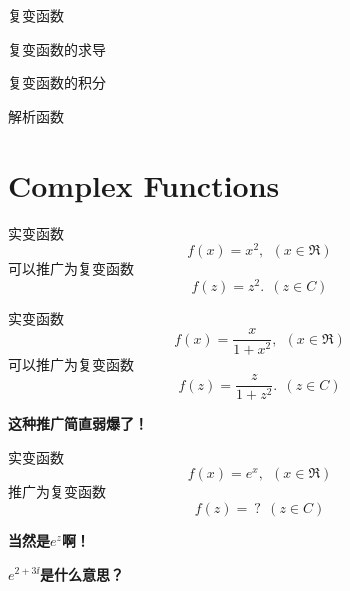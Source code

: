 \documentclass[CJK]{beamer}
\date{}
\begin{document}


\begin{frame}
\bch
\bitem
\item{复变函数}
\item{复变函数的求导}
\item{复变函数的积分}
\item{解析函数}
\eitem
\ech
\end{frame}


\section{Complex Functions}


\begin{frame}
  \bch
  

  \bex
  实变函数
  $$f(x) = x^2, \ \ (x\in \Re)$$
  可以推广为复变函数
  $$f(z) = z^2. \ \ (z\in C) $$
  \eex

  \ech
\end{frame}


\begin{frame}
  \bch
  

  \bex
  实变函数
  $$f(x) = \frac{x}{1+x^2},\ \ (x\in \Re)$$
  可以推广为复变函数
  $$f(z) = \frac{z}{1+z^2}. \ \ (z\in C)$$
  \eex

  \ech
\end{frame}



\begin{frame}
  \bch

  \bcenter
      {\bf \Large 这种推广简直弱爆了！}

      \ecenter
  \ech
\end{frame}


\begin{frame}
  \bch
  实变函数
  $$f(x) = e^x,\ \ (x\in \Re)$$
  推广为复变函数
  $$f(z) = \ ? \ \ (z\in C)$$
  \ech
\end{frame}

\begin{frame}
  \bch
  \bcenter
  {\bf \Large 当然是$e^z$啊！}
  \ecenter
  \ech
\end{frame}


\begin{frame}
  \bch
  \bcenter
  {\Large \bf  $e^{2+3\ii}$是什么意思？}
  \ecenter
  \ech
\end{frame}
\end{document}
